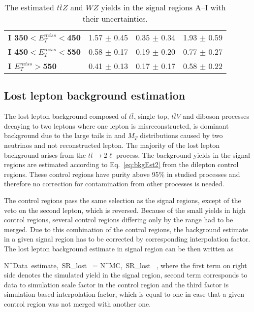 \begin{table}[h]
{\begin{tabular}{|l|ccc|}
\textbf{ I 350$<E_T^{miss}<$450}         & 1.57 $\pm$ 0.45       & 0.35 $\pm$ 0.34       & 1.93 $\pm$ 0.59       \\
\textbf{ I 450$<E_T^{miss}<$550}         & 0.58 $\pm$ 0.17       & 0.19 $\pm$ 0.20       & 0.77 $\pm$ 0.27       \\
\textbf{ I $E_T^{miss}>$550}     & 0.41 $\pm$ 0.13       & 0.17 $\pm$ 0.17       & 0.58 $\pm$ 0.22       \\
\hline
\end{tabular}}
\caption[Table caption text]{The estimated $t\bar{t}Z$ and $WZ$ yields in the signal regions A--I with their uncertainties. }
\label{tab:YZnunu}
\end{table}


\subsection{Lost lepton background estimation}

The lost lepton background composed of $t\bar{t}$, single top, $t\bar{t}V$ and diboson processes decaying to two leptons where one lepton is misreconstructed, is dominant background due to the large tails in \MET and $M_{T}$ distributions caused by two neutrinos and not reconstructed lepton. The majority of the lost lepton background arises from the $t\bar{t} \to 2\ell$ process. The background yields in the signal regions are estimated according to Eq.~\ref{eq:bkgEst2} from the dilepton control regions. These control regions have purity above 95\% in studied processes and therefore no correction for contamination from other processes is needed. 

The control regions pass the same selection as the signal regions, except of the veto on the second lepton, which is reversed. Because of the small yields in high \MET control regions, several control regions differing only by the \MET range had to be merged. Due to this combination of the control regions, the background estimate in a given signal region has to be corrected by corresponding interpolation factor. The lost lepton background estimate in signal region can be then written as

{
N^{Data~estimate,~SR}_{lost~\ell}  = N^{MC,~SR}_{lost~\ell} \times  {} \times {},
}
where the first term on right side denotes the simulated yield in the signal region, second term corresponds to data to simulation scale factor in the control region and the third factor is simulation based interpolation factor, which is equal to one in case that a given control region was not merged with another one.

